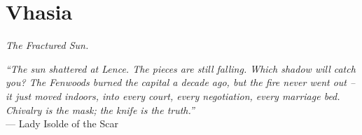 \documentclass[12pt,oneside]{book}
\begin{document}


\newpage

\chapter{Vhasia}
\emph{The Fractured Sun.}

\noindent
\textit{``The sun shattered at Lence. The pieces are still falling. Which shadow will catch you? The Fenwoods burned the capital a decade ago, but the fire never went out -- it just moved indoors, into every court, every negotiation, every marriage bed. Chivalry is the mask; the knife is the truth.''} \\
--- Lady Isolde of the Scar

\vspace{1em}
\end{document}
